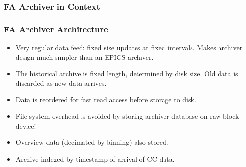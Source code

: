 \documentclass{beamer}
\begin{document}
\begin{frame}\frametitle{FA Archiver in Context}
\begin{center}

\end{center}
\end{frame}






\begin{frame}\frametitle{FA Archiver Architecture}

\begin{itemize}

\item Very regular data feed: fixed size updates at fixed intervals.
Makes archiver design much simpler than an EPICS archiver.

\item The historical archive is fixed length, determined by disk size.  Old data
is discarded as new data arrives.

\item Data is reordered for fast read access before storage to disk.

\item File system overhead is avoided by storing archiver database on raw block
device!

\item Overview data (decimated by binning) also stored.

\item Archive indexed by timestamp of arrival of CC data.

\end{itemize}
\end{frame}
\end{document}
